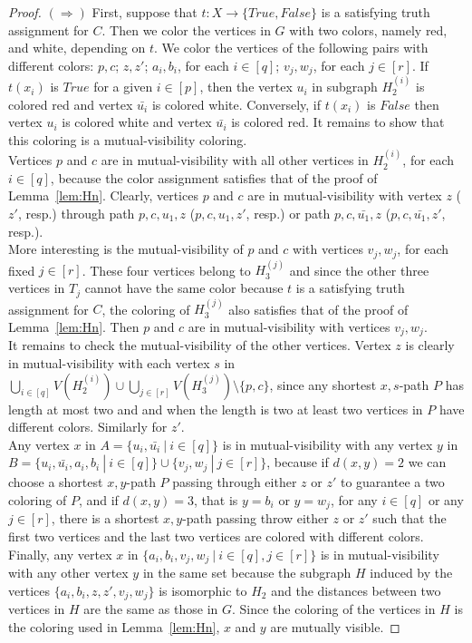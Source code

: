 \documentclass[12pt]{article}
\begin{document}
\begin{proof}
\bigskip
$(\Rightarrow)$ First, suppose that $t: X\rightarrow \{True,False\}$ is a satisfying truth assignment for $C$. 
Then we color the vertices in $G$ with two colors, namely red, and white, depending on $t$. We color the vertices of the following pairs with different colors: $p,c$; $z,z'$; $a_i,b_i$, for each $i\in[q]$; $v_j,w_j$, for each $j\in [r]$.
%
If $t(x_i)$ is $True$ for a given $i\in [p]$, then  the vertex $u_{i}$ in subgraph $H_2^{(i)}$ is colored red and vertex $\bar{u_i}$ is colored white. Conversely, if $t(x_i)$ is $False$ then  vertex $u_{i}$ is colored white and vertex $\bar {u_i}$ is colored red.
It remains to show that this coloring is a mutual-visibility coloring. \\
Vertices $p$ and $c$ are in mutual-visibility with all other vertices in $H_2^{(i)}$, for each $i\in [q]$, because the color assignment satisfies that of the proof of Lemma~\ref{lem:Hn}. Clearly, vertices $p$ and $c$ are in mutual-visibility with vertex $z$ ($z'$, resp.) through path $p,c,u_1,z$ ($p,c,u_1,z'$, resp.) or path $p,c,\bar{u_1},z$ ($p,c,\bar{u_1},z'$, resp.).\\
More interesting is the mutual-visibility of $p$ and $c$ with vertices $v_j,w_j$, for each fixed $j\in [r]$. These four vertices belong to $H_3^{(j)}$ and since the other three vertices in $T_j$ cannot have the same color because $t$ is a satisfying truth assignment for $C$, the coloring of $H_3^{(j)}$ also satisfies that of the proof of Lemma~\ref{lem:Hn}. Then $p$ and $c$ are in mutual-visibility with vertices $v_j,w_j$.\\
It remains to check the mutual-visibility of the other vertices. Vertex $z$ is clearly in mutual-visibility with each vertex $s$ in $\bigcup_{i\in [q]} V(H_2^{(i)})\cup \bigcup_{ j\in [r]} V(H_3^{(j)})\setminus \{p,c\}$, since any shortest $x,s$-path $P$ has length at most two and and when the length is two at least two vertices in $P$ have different colors. Similarly for $z'$.\\
 Any vertex $x$ in $A=\{u_i, \bar{u_i}~|~i \in [q]\}$ is in mutual-visibility with any vertex $y$ in $B=\{u_i,\bar{u_i},a_i,b_i~|~i \in [q]\}\cup\{v_j,w_j~|~j\in[r]\}$, because if $d(x,y)=2$ we can choose a shortest $x,y$-path $P$ passing through either $z$ or $z'$ to guarantee a two coloring of $P$, and if  $d(x,y)=3$, that is $y=b_i$ or $y=w_j$, for any $i\in [q]$ or any $j\in [r]$, there is a shortest $x,y$-path passing throw either $z$ or $z'$ such that the first two vertices and the last two vertices are colored with different colors.\\
 Finally, any vertex $x$ in $\{a_i, b_i,v_j,w_j~|~i \in [q], j\in[r]\}$ is in mutual-visibility with any other vertex $y$ in the same set because the subgraph $H$ induced by the vertices $\{a_i,b_i,z,z',v_j,w_j\}$ is isomorphic to $H_2$ and the distances between two vertices in $H$ are the same as those in $G$. Since the coloring of the vertices in $H$ is the coloring used in Lemma~\ref{lem:Hn}, $x$ and $y$ are mutually visible.


\end{proof}
\end{document}
